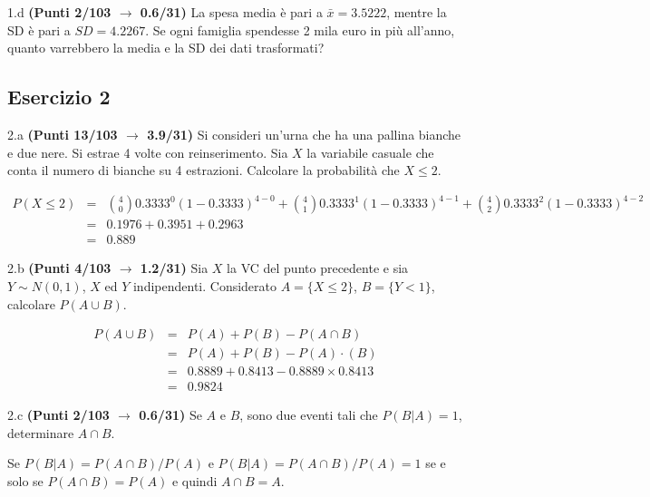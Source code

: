 \documentclass[
  11pt,
]{book}
\theoremstyle{mytheoremstyle}
\theoremstyle{mydefstyle}
\newenvironment{sol}
  {
  \begin{tcolorbox}[enhanced,breakable,arc=0.1mm,boxrule=1pt,colback=white,colframe=iblue,
  title=\bf \fontfamily{lmss}\selectfont \hspace{.5 cm} Soluzione,drop fuzzy shadow]

}{
\end{tcolorbox}
  }
\begin{document}
1.d \textbf{(Punti 2/103 \(\rightarrow\) 0.6/31)} La spesa media è pari a \(\bar x=3.5222\), mentre la SD è pari a \(SD=4.2267\).
Se ogni famiglia spendesse 2 mila euro in più all'anno, quanto varrebbero la media e la SD dei dati trasformati?

\subsection{Esercizio 2}\label{esercizio-2-37}

2.a \textbf{(Punti 13/103 \(\rightarrow\) 3.9/31)} Si consideri un'urna che ha una pallina bianche e due nere. Si estrae 4 volte con reinserimento. Sia \(X\) la variabile casuale che conta il numero di bianche su 4 estrazioni. Calcolare la probabilità che \(X\leq 2\).

\begin{sol}
\normalsize 
\begin{eqnarray*}
      P( X \leq 2 ) &=& \binom{ 4 }{ 0 } 0.3333 ^{ 0 }(1- 0.3333 )^{ 4 - 0 }+\binom{ 4 }{ 1 } 0.3333 ^{ 1 }(1- 0.3333 )^{ 4 - 1 }+\binom{ 4 }{ 2 } 0.3333 ^{ 2 }(1- 0.3333 )^{ 4 - 2 } \\                 &=& 0.1976+0.3951+0.2963 \\                 &=& 0.889 
   \end{eqnarray*}
\normalsize 

\end{sol}

2.b \textbf{(Punti 4/103 \(\rightarrow\) 1.2/31)} Sia \(X\) la VC del punto precedente e sia \(Y\sim N(0,1)\), \(X\) ed \(Y\) indipendenti. Considerato \(A=\{X\leq 2\}\), \(B=\{Y<1\}\), calcolare \(P(A\cup B)\).

\begin{sol}
\begin{eqnarray}
      P( A \cup B ) &=& P( A )+P( B )-P( A \cap B ) \\
                         &=& P( A )+P( B )-P( A )\cdot ( B ) \\
                         &=&  0.8889 + 0.8413 - 0.8889 \times 0.8413  \\
                         &=&  0.9824 \end{eqnarray}

\end{sol}

2.c \textbf{(Punti 2/103 \(\rightarrow\) 0.6/31)} Se \(A\) e \(B\), sono due eventi tali che \(P(B|A)=1\), determinare \(A\cap B\).

\begin{sol}
Se \(P(B|A)=P(A\cap B)/P(A)\) e \(P(B|A)=P(A\cap B)/P(A)=1\) se e solo se \(P(A\cap B)=P(A)\) e quindi \(A\cap B = A\).

\end{sol}
\end{document}
